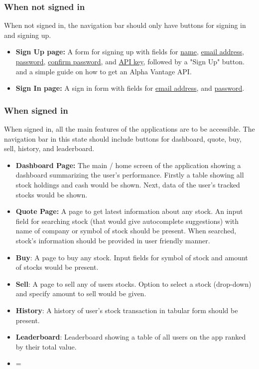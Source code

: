\documentclass[12 pt, a4paper]{report}
\begin{document}
	\subsubsection{When not signed in}
	When not signed in, the navigation bar should only have buttons for signing in and signing up.
	\begin{itemize}
		\item \textbf{Sign Up page:} A form for signing up with fields for \underline{name}, \underline{email address}, \underline{password}, \underline{confirm password}, and \underline{API key}, followed by a "Sign Up" button. and a simple guide on how to get an Alpha Vantage API.
		\item \textbf{Sign In page:} A sign in form with fields for \underline{email address}, and \underline{password}.
	\end{itemize}

	\subsubsection{When signed in}
	When signed in, all the main features of the applications are to be accessible. The navigation bar in this state should include buttons for dashboard, quote, buy, sell, history, and leaderboard.
	\begin{itemize}
		\item \textbf{Dashboard Page:} The main / home screen of the application showing a dashboard summarizing the user's performance. Firstly a table showing all stock holdings and cash would be shown. Next, data of the user's tracked stocks would  be shown.
		\item \textbf{Quote Page: } A page to get latest information about any stock. An input field for searching stock (that would give autocomplete suggestions) with name of company or symbol of stock should be present. When searched, stock's information should be provided in user friendly manner.
		\item \textbf{Buy}: A page to buy any stock. Input fields for symbol of stock and amount of stocks would be present.
		\item \textbf{Sell}: A page to sell any of users stocks. Option to select a stock (drop-down) and specify amount to sell would be given.
		\item \textbf{History}: A history of user's stock transaction in tabular form should be present.
		\item \textbf{Leaderboard}: Leaderboard showing a table of all users on the app ranked by their total value.
		\item=
	\end{itemize}
	
\end{document}
